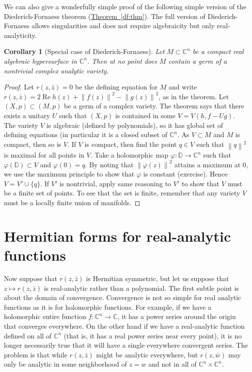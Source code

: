 \documentclass[12pt,openany]{book}
\renewcommand{\Re}{\operatorname{Re}}
\newcommand{\norm}[1]{\left\lVert {#1} \right\rVert}
\newcommand{\C}{{\mathbb{C}}}
\newcommand{\bD}{{\mathbb{D}}}
\newcommand{\sectionnewpage}{}
\theoremstyle{plain}
\newtheorem{cor}[thm]{Corollary}
\theoremstyle{remark}
\theoremstyle{definition}
\theoremstyle{exercise}
\theoremstyle{example}
\newcommand{\thmref}[1]{\hyperref[#1]{Theorem~\ref*{#1}}}
\begin{document}
We can also give a wonderfully simple proof of the following simple
version of the Diederich-Fornaess theorem (\thmref{df:thm}).
The full version of
Diederich-Fornaess allows singularities and does not require algebraicity but
only real-analyticity.

\begin{cor}[Special case of Diederich-Fornaess]
Let $M \subset \C^n$ be a compact real algebraic hypersurface in $\C^n$.
Then at no point does $M$ contain a germ of a nontrivial complex analytic variety.
\end{cor}

\begin{proof}
Let $r(z,\bar{z})=0$ be the defining equation for $M$ and write
$r(z,\bar{z}) = 2 \Re h(z) + \norm{f(z)}^2-\norm{g(z)}^2$, as in the theorem.
Let $(X,p) \subset (M,p)$ be a germ of a complex variety.  The theorem says
that there exists a unitary $U$ such that $(X,p)$ is contained in some
$V = V(h,f-Ug)$.  The variety $V$ is algebraic (defined by polynomials), so
it has global set of defining equations (in particular it is a closed subset
of $\C^n$.  As $V \subset M$ and $M$ is compact, then so is $V$.  If $V$ is
compact, then find the point $q \in V$ such that $\norm{q}^2$ is maximal for
all points in $V$.  Take a holomorphic map $\varphi \colon \bD \to \C^n$
such that $\varphi(\bD) \subset V$ and $\varphi(0) = q$.  By noting that
$\norm{\varphi(z)}^2$ attains a maximum at $0$, we use the maximum principle
to show that $\varphi$ is constant (exercise).  Hence $V = V' \cup \{ q \}$.
If $V'$ is nontrivial, apply same reasoning to $V'$ to show that $V$ must be
a finite set of points.  To see that the set is finite, remember that any
variety $V$ must be a locally finite union of manifolds.
\end{proof}



\sectionnewpage
\section{Hermitian forms for real-analytic functions} \label{sec:hermforms}

Now suppose that $r(z,\bar{z})$ is Hermitian symmetric, but let us suppose
that $z \mapsto r(z,\bar{z})$ is real-analytic rather than a polynomial.
The first subtle point is
about the domain of convergence.  Convergence is not so simple for real
analytic functions as it is for holomorphic functions.  For example, if we
have a holomorphic entire function $f \colon \C^n \to \C$, it has a power
series around the origin that converges everywhere.  On the other hand
if we have a real-analytic function defined on all of $\C^n$ (that is, it has
a real power series near every point), it is no longer necessarily true that
it will have a single everywhere convergent series.  The problem is that
while $r(z,\bar{z})$ might be analytic everywhere, but
$r(z,\bar{w})$ may only be analytic in some neighborhood of $z=w$ and not in
all of $\C^n \times \C^n$.
\end{document}
